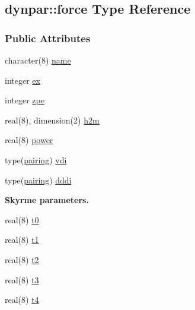\hypertarget{structdynpar_1_1force}{}\subsection{dynpar\+:\+:force Type Reference}
\label{structdynpar_1_1force}
\subsubsection*{Public Attributes}
\begin{DoxyCompactItemize}
\item 
character(8) \hyperlink{structdynpar_1_1force_ad32644ba4effee4dc9d34bb491f1809d}{name}
\item 
integer \hyperlink{structdynpar_1_1force_aa99fc3f79a03fa315151ac8fc8034ed1}{ex}
\item 
integer \hyperlink{structdynpar_1_1force_ab57b63f56eba034aa8503eb097d7962e}{zpe}
\item 
real(8), dimension(2) \hyperlink{structdynpar_1_1force_a7ac5c85f6e06b5efdfd37ff3d5531aa4}{h2m}
\item 
real(8) \hyperlink{structdynpar_1_1force_a9ca99487f86a96dad10e90915b8b2581}{power}
\item 
type(\hyperlink{structdynpar_1_1pairing}{pairing}) \hyperlink{structdynpar_1_1force_a6139d7329e66d997ac50614c75d891c8}{vdi}
\item 
type(\hyperlink{structdynpar_1_1pairing}{pairing}) \hyperlink{structdynpar_1_1force_a7508e820b8361b43a84a5c680b6e78ec}{dddi}
\end{DoxyCompactItemize}
\begin{Indent}{\bf Skyrme parameters.}\par
\begin{DoxyCompactItemize}
\item 
real(8) \hyperlink{structdynpar_1_1force_a38f4dbe511309f72ba881bc84c812d76}{t0}
\item 
real(8) \hyperlink{structdynpar_1_1force_a8dd79e1c04fbf0afc2e7b801f3d25e0d}{t1}
\item 
real(8) \hyperlink{structdynpar_1_1force_a9a4405f24cd5f79f697ccc727fffb0eb}{t2}
\item 
real(8) \hyperlink{structdynpar_1_1force_a9afe502525940975b651d72a944a9eae}{t3}
\item 
real(8) \hyperlink{structdynpar_1_1force_a2b80a3b8eba53165fec4e470b6a3d1ac}{t4}
\end{DoxyCompactItemize}
\end{Indent}
